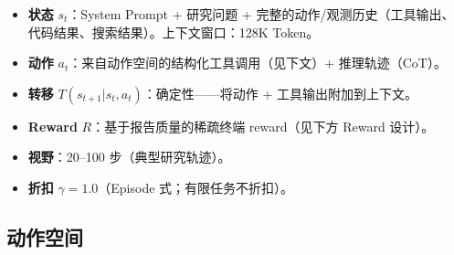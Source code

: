 \begin{keybox}
\begin{itemize}
  \item \textbf{状态} $s_t$：System Prompt + 研究问题 + 完整的动作/观测历史（工具输出、代码结果、搜索结果）。上下文窗口：128K Token。
  \item \textbf{动作} $a_t$：来自动作空间的结构化工具调用（见下文）+ 推理轨迹（CoT）。
  \item \textbf{转移} $T(s_{t+1}|s_t, a_t)$：确定性——将动作 + 工具输出附加到上下文。
  \item \textbf{Reward} $R$：基于报告质量的稀疏终端 reward（见下方 Reward 设计）。
  \item \textbf{视野}：20--100 步（典型研究轨迹）。
  \item \textbf{折扣} $\gamma = 1.0$（Episode 式；有限任务不折扣）。
\end{itemize}
\end{keybox}

\subsection{动作空间}
\label{action-space}

